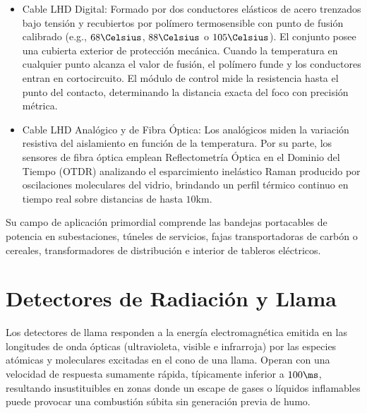 \begin{itemize}
    \item Cable LHD Digital: Formado por dos conductores elásticos de acero trenzados bajo tensión y
          recubiertos por polímero termosensible con punto de fusión calibrado (e.g., $68\Celsius$,
          $88\Celsius$ o $105\Celsius$). El conjunto posee una cubierta exterior de protección mecánica.
          Cuando la temperatura en cualquier punto alcanza el valor de fusión, el polímero funde y los
          conductores entran en cortocircuito. El módulo de control mide la resistencia hasta el punto
          del contacto, determinando la distancia exacta del foco con precisión métrica.
    \item Cable LHD Analógico y de Fibra Óptica: Los analógicos miden la variación resistiva del aislamiento en función
          de la temperatura. Por su parte, los sensores de fibra óptica emplean Reflectometría Óptica
          en el Dominio del Tiempo (OTDR) analizando el esparcimiento inelástico Raman producido por oscilaciones
          moleculares del vidrio, brindando un perfil térmico continuo en tiempo real sobre distancias de hasta
          $10\unit{\kilo\meter}$.
\end{itemize}
Su campo de aplicación primordial comprende las bandejas portacables de potencia en subestaciones, túneles de servicios,
fajas transportadoras de carbón o cereales, transformadores de distribución e interior de tableros eléctricos.

\section{Detectores de Radiación y Llama}

Los detectores de llama responden a la energía electromagnética emitida en las longitudes de onda ópticas (ultravioleta,
visible e infrarroja) por las especies atómicas y moleculares excitadas en el cono de una llama. Operan con una velocidad de
respuesta sumamente rápida, típicamente inferior a $100\ms$, resultando insustituibles en zonas donde un escape de gases o
líquidos inflamables puede provocar una combustión súbita sin generación previa de humo.

